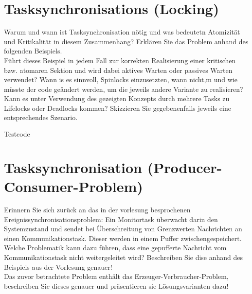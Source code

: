 \documentclass[12pt,a4paper,ngerman]{article}
\begin{document}


%
%

\section*{Tasksynchronisations (Locking)}


\begin{framed}
Warum und wann ist Tasksynchronisation nötig und was bedeutetn Atomizität und Kritikalität in diesem Zusammenhang?
Erklären Sie das Problem anhand des folgenden Beispiels. \\
Führt dieses Beispiel in jedem Fall zur korrekten Realisierung einer kritischen bzw. atomaren Sektion und wird dabei aktives Warten oder passives Warten verwendet?
Wann is es sinnvoll, Spinlocks einzusetzten, wann nicht,m und wie müsste der code geändert werden, um die jeweils andere Variante zu realisieren? \\
Kann es unter Verwendung des gezeigten Konzepts durch mehrere Tasks zu Lifelocks oder Deadlocks kommen? Skizzieren Sie gegebenenfalls jeweils eine entsprechendes Szenario.
\end{framed}

Testcode





\pagebreak
\section*{Tasksynchronisation (Producer-Consumer-Problem)}


\begin{framed}
Erinnern Sie sich zurück an das in der vorlesung besprochenen Ereignissynchronisationsproblem: Ein Monitortask überwacht darin den Systemzustand und sendet bei Überschreitung von Grenzwerten Nachrichten an einen Kommunikationstask. Dieser werden in einem Puffer zwischengespeichert. \\
Welche Problematik kann dazu führen, dass eine gepufferte Nachricht vom Kommunikationstask nicht weitergeleitet wird? Beschreiben Sie dise anhand des Beispiels aus der Vorlesung genauer!\\
Das zuvor betrachtete Problem enthält das Erzeuger-Verbraucher-Problem, beschreiben Sie dieses genauer und präsentieren sie Lösungsvarianten dazu!
\end{framed}
\end{document}
